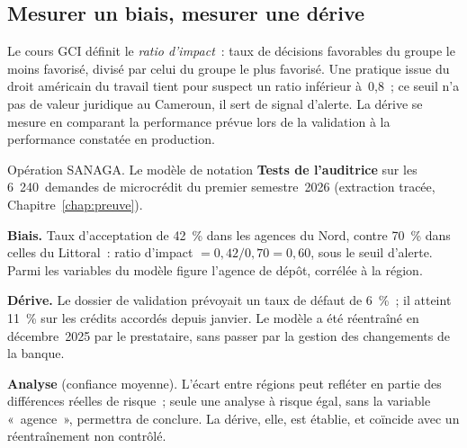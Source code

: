 \subsection{Mesurer un biais, mesurer une dérive}

Le cours GCI définit le \emph{ratio d'impact}~: taux de décisions
favorables du groupe le moins favorisé, divisé par celui du groupe le plus
favorisé. Une pratique issue du droit américain du travail tient pour
suspect un ratio inférieur à~0,8~; ce seuil n'a pas de valeur juridique au
Cameroun, il sert de signal d'alerte. La dérive se mesure en comparant la
performance prévue lors de la validation à la performance constatée en
production.

\begin{boxscenario}{Opération SANAGA. Le modèle de notation}
\textbf{Tests de l'auditrice} sur les 6~240~demandes de microcrédit du
premier semestre~2026 (extraction tracée, Chapitre~\ref{chap:preuve}).

\medskip
\textbf{Biais.} Taux d'acceptation de 42~\% dans les agences du Nord,
contre 70~\% dans celles du Littoral~: ratio d'impact
$= 0{,}42 / 0{,}70 = 0{,}60$, sous le seuil d'alerte. Parmi les variables
du modèle figure l'agence de dépôt, corrélée à la région.

\medskip
\textbf{Dérive.} Le dossier de validation prévoyait un taux de défaut de
6~\%~; il atteint 11~\% sur les crédits accordés depuis janvier. Le modèle
a été réentraîné en décembre~2025 par le prestataire, sans passer par la
gestion des changements de la banque.

\medskip
\textbf{Analyse} (confiance moyenne). L'écart entre régions peut refléter
en partie des différences réelles de risque~; seule une analyse à risque
égal, sans la variable «~agence~», permettra de conclure. La dérive, elle,
est établie, et coïncide avec un réentraînement non contrôlé.
\end{boxscenario}

